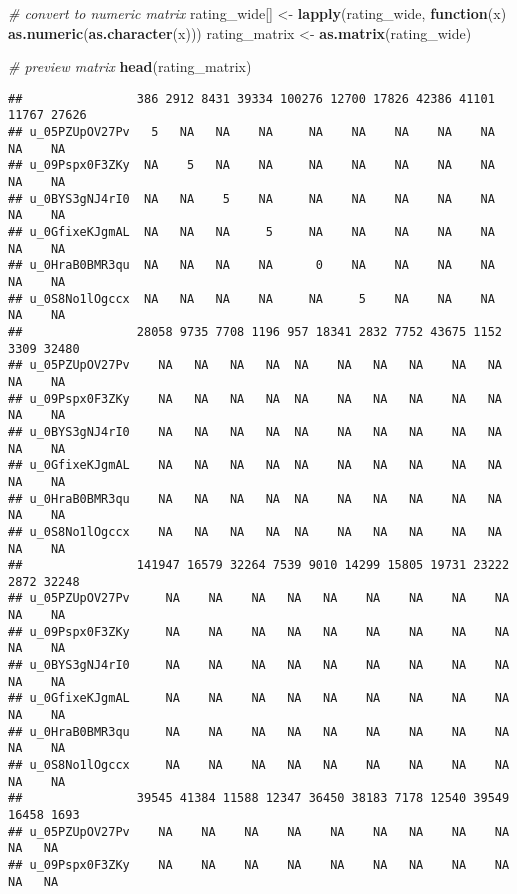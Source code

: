 \documentclass[
]{article}
\newenvironment{Shaded}{\begin{snugshade}}{\end{snugshade}}
\newcommand{\CommentTok}[1]{\textcolor[rgb]{0.56,0.35,0.01}{\textit{#1}}}
\newcommand{\ControlFlowTok}[1]{\textcolor[rgb]{0.13,0.29,0.53}{\textbf{#1}}}
\newcommand{\FunctionTok}[1]{\textcolor[rgb]{0.13,0.29,0.53}{\textbf{#1}}}
\newcommand{\NormalTok}[1]{#1}
\newcommand{\OtherTok}[1]{\textcolor[rgb]{0.56,0.35,0.01}{#1}}
\begin{document}
\begin{Shaded}
\begin{Highlighting}[]
\CommentTok{\# convert to numeric matrix}
\NormalTok{rating\_wide[] }\OtherTok{\textless{}{-}} \FunctionTok{lapply}\NormalTok{(rating\_wide, }\ControlFlowTok{function}\NormalTok{(x) }\FunctionTok{as.numeric}\NormalTok{(}\FunctionTok{as.character}\NormalTok{(x)))}
\NormalTok{rating\_matrix }\OtherTok{\textless{}{-}} \FunctionTok{as.matrix}\NormalTok{(rating\_wide)}

\CommentTok{\# preview matrix}
\FunctionTok{head}\NormalTok{(rating\_matrix)}
\end{Highlighting}
\end{Shaded}

\begin{verbatim}
##                386 2912 8431 39334 100276 12700 17826 42386 41101 11767 27626
## u_05PZUpOV27Pv   5   NA   NA    NA     NA    NA    NA    NA    NA    NA    NA
## u_09Pspx0F3ZKy  NA    5   NA    NA     NA    NA    NA    NA    NA    NA    NA
## u_0BYS3gNJ4rI0  NA   NA    5    NA     NA    NA    NA    NA    NA    NA    NA
## u_0GfixeKJgmAL  NA   NA   NA     5     NA    NA    NA    NA    NA    NA    NA
## u_0HraB0BMR3qu  NA   NA   NA    NA      0    NA    NA    NA    NA    NA    NA
## u_0S8No1lOgccx  NA   NA   NA    NA     NA     5    NA    NA    NA    NA    NA
##                28058 9735 7708 1196 957 18341 2832 7752 43675 1152 3309 32480
## u_05PZUpOV27Pv    NA   NA   NA   NA  NA    NA   NA   NA    NA   NA   NA    NA
## u_09Pspx0F3ZKy    NA   NA   NA   NA  NA    NA   NA   NA    NA   NA   NA    NA
## u_0BYS3gNJ4rI0    NA   NA   NA   NA  NA    NA   NA   NA    NA   NA   NA    NA
## u_0GfixeKJgmAL    NA   NA   NA   NA  NA    NA   NA   NA    NA   NA   NA    NA
## u_0HraB0BMR3qu    NA   NA   NA   NA  NA    NA   NA   NA    NA   NA   NA    NA
## u_0S8No1lOgccx    NA   NA   NA   NA  NA    NA   NA   NA    NA   NA   NA    NA
##                141947 16579 32264 7539 9010 14299 15805 19731 23222 2872 32248
## u_05PZUpOV27Pv     NA    NA    NA   NA   NA    NA    NA    NA    NA   NA    NA
## u_09Pspx0F3ZKy     NA    NA    NA   NA   NA    NA    NA    NA    NA   NA    NA
## u_0BYS3gNJ4rI0     NA    NA    NA   NA   NA    NA    NA    NA    NA   NA    NA
## u_0GfixeKJgmAL     NA    NA    NA   NA   NA    NA    NA    NA    NA   NA    NA
## u_0HraB0BMR3qu     NA    NA    NA   NA   NA    NA    NA    NA    NA   NA    NA
## u_0S8No1lOgccx     NA    NA    NA   NA   NA    NA    NA    NA    NA   NA    NA
##                39545 41384 11588 12347 36450 38183 7178 12540 39549 16458 1693
## u_05PZUpOV27Pv    NA    NA    NA    NA    NA    NA   NA    NA    NA    NA   NA
## u_09Pspx0F3ZKy    NA    NA    NA    NA    NA    NA   NA    NA    NA    NA   NA

\end{verbatim}
\end{document}

